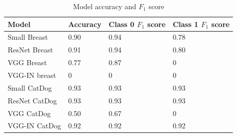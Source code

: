 \begin{table}
\centering
\begin{tabular}{ |p{3cm}||p{3cm}|p{3cm}|p{3cm}|  }
 \hline
 Model       & Accuracy & Class 0 $F_1$ score & Class 1 $F_1$ score\\
 \hline
 \hline
 Small Breast   & 0.90  & 0.94 &  0.78\\
 ResNet Breast  & 0.91  & 0.94 &  0.80\\
 VGG Breast      & 0.77  & 0.87 &  0\\
 VGG-IN breast & 0 & 0 & 0 \\
 \hline
 Small CatDog   & 0.93  & 0.93 &  0.93\\
 ResNet CatDog  & 0.93  & 0.93 &  0.93\\
 VGG CatDog      & 0.50  & 0.67 &  0\\
 VGG-IN CatDog & 0.92 & 0.92 & 0.92 \\
  \hline
\end{tabular}
\caption{Model accuracy and $F_1$ score}
\label{acctable2}
\end{table}
